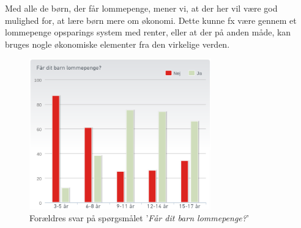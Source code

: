 Med alle de børn, der får lommepenge, mener vi, at der her vil være god mulighed for, at lære børn mere om økonomi. Dette kunne fx være gennem et lommepenge opsparings system med renter, eller at der på anden måde, kan bruges nogle økonomiske elementer fra den virkelige verden.

\begin{figure}[htb]
\centering
\includegraphics[width=0.7\textwidth]{Billeder/FaarBarnLommepenge.png}
\caption{Forældres svar på spørgsmålet '\textit{Får dit barn lommepenge?}'}
\label{FaarBarnLommepenge}
\end{figure}